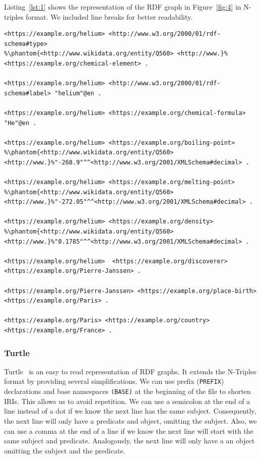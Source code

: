 Listing~\ref{lst:1} shows the representation of the RDF graph in Figure~\ref{fig:4} in N-triples format. We included line breaks for better readability.

\begin{minipage}{\linewidth}
\begin{lstlisting}[columns=fullflexible, label=lst:1, caption={RDF graph represented in N-triples syntax}, language=SPARQL]
<https://example.org/helium> <http://www.w3.org/2000/01/rdf-schema#type>
%\phantom{<http://www.wikidata.org/entity/Q560> <http://www.}%<https://example.org/chemical-element> .
		                                                
<https://example.org/helium> <http://www.w3.org/2000/01/rdf-schema#label> "helium"@en .

<https://example.org/helium> <https://example.org/chemical-formula> "He"@en .

<https://example.org/helium> <https://example.org/boiling-point> 
%\phantom{<http://www.wikidata.org/entity/Q560> <http://www.}%"-268.9"^^<http://www.w3.org/2001/XMLSchema#decimal> .

<https://example.org/helium> <https://example.org/melting-point> 
%\phantom{<http://www.wikidata.org/entity/Q560> <http://www.}%"-272.05"^^<http://www.w3.org/2001/XMLSchema#decimal> .

<https://example.org/helium> <https://example.org/density> 
%\phantom{<http://www.wikidata.org/entity/Q560> <http://www.}%"0.1785"^^<http://www.w3.org/2001/XMLSchema#decimal> .

<https://example.org/helium>  <https://example.org/discoverer> <https://example.org/Pierre-Janssen> .

<https://example.org/Pierre-Janssen> <https://example.org/place-birth> <https://example.org/Paris> .

<https://example.org/Paris> <https://example.org/country> <https://example.org/France> .
\end{lstlisting}
\end{minipage}

\subsubsection*{Turtle}
\label{subsubsec:turtle}
Turtle~\cite{D.Beckett} is an easy to read representation of RDF graphs. It extends the N-Triples format by providing several simplifications. We can use prefix (\texttt{PREFIX}) declarations and base namespaces \texttt{(BASE)} at the beginning of the file to shorten IRIs. This allows us to avoid repetition. We can use a semicolon at the end of a line instead of a dot if we know the next line has the same subject. Consequently, the next line will only have a predicate and object, omitting the subject. Also, we can use a comma at the end of a line if we know the next line will start with the same subject and predicate. Analogously, the next line will only have a an object omitting the subject and the predicate. 

